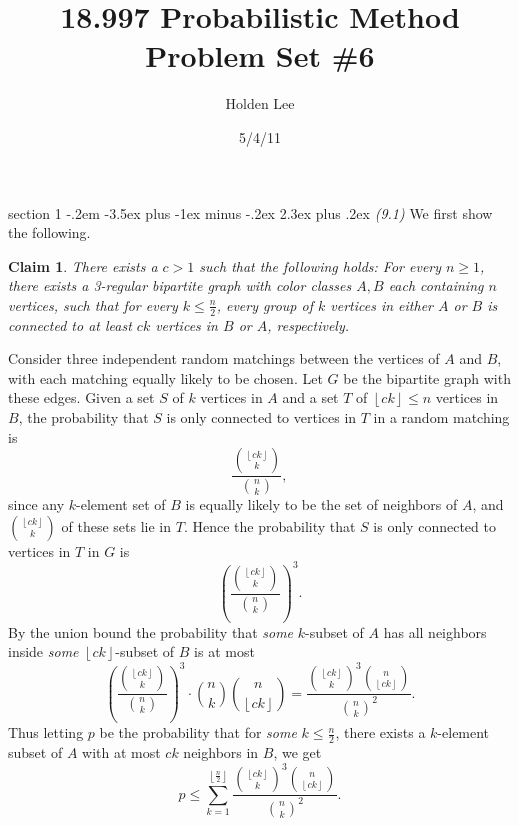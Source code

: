 \documentclass[12pt]{article}
\makeatletter
\theoremstyle{norm}
\newtheorem{clm}[thm]{Claim}
\newcommand{\pa}[1]{\left( {#1} \right)}
\newcommand{\fl}[1]{\left\lfloor {#1}\right\rfloor}
\newenvironment{problem}{\@startsection
       {section}
       {1}
       {-.2em}
       {-3.5ex plus -1ex minus -.2ex}
       {2.3ex plus .2ex}
       {\pagebreak[3]%
       \large\bf\noindent{Problem }
       }
       }
       {%
       }
\makeatother
\begin{document}
\title{18.997 Probabilistic Method Problem Set \#6}%
\author{Holden Lee}
\date{5/4/11}%
\maketitle
\thispagestyle{empty}

\begin{problem}{\it(9.1)}
We first show the following. 
\begin{clm}\label{c1}
There exists a $c>1$ such that the following holds: For every $n\ge 1$,
there exists a 3-regular bipartite graph with color classes $A,B$ each containing $n$ vertices, such that for every $k\le \frac n2$, every group of $k$ vertices in either $A$ or $B$ is connected to at least $ck$ vertices in $B$ or $A$, respectively.

\end{clm}

Consider three independent random matchings between the vertices of $A$ and $B$, with each matching equally likely to be chosen. Let $G$ be the bipartite graph with these edges. 
Given a set $S$ of $k$ vertices in $A$ and a set $T$ of $\fl{ck}\le n$ vertices in $B$, the probability that $S$ is only connected to vertices in $T$ in a random matching is
\[\frac{\binom{\fl{ck}}{k}}{\binom{n}{k}},\] 
since any $k$-element set of $B$ is equally likely to be the set of neighbors of $A$, and $\binom{\fl{ck}}{k}$ of these sets lie in $T$. 
Hence the probability that $S$ is only connected to vertices in $T$ in $G$ is \[\left(\frac{\binom{\fl{ck}}{k}}{\binom{n}{k}}\right)^3.\]
By the union bound the probability that {\it some} $k$-subset of $A$ has all neighbors inside {\it some} $\fl{ck}$-subset of $B$ is at most
\[
\left(\frac{\binom{\fl{ck}}{k}}{\binom{n}{k}}\right)^3\cdot\binom nk\binom n{\fl{ck}}=\frac{\binom{\fl{ck}}{k}^3\binom n{\fl{ck}}}{\binom nk^2}.
\]
Thus letting $p$ be the probability that for {\it some} $k\le \frac n2$, there exists a $k$-element subset of $A$ with at most $ck$ neighbors in $B$, we get
\[
p\le\sum_{k=1}^{\fl{\frac n2}} \frac{\binom{\fl{ck}}{k}^3\binom{n}{\fl{ck}}}{\binom nk^2}.
\]


\end{problem}
\end{document}
